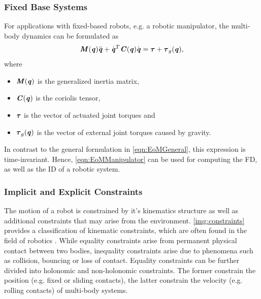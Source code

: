 \subsubsection{Fixed Base Systems}
For applications with fixed-based robots, e.g. a robotic manipulator, the multi-body dynamics can be formulated as
\begin{equation} \label{eqn:EoMManipulator}
\bm{\mathit{M}}(\bm{\mathit{q}})\ddot{\bm{\mathit{q}}}+\dot{\bm{\mathit{q}}}^T\bm{\mathit{C}}(\bm{\mathit{q}})\dot{\bm{\mathit{q}}}=\bm{\mathit{\tau}}+\bm{\mathit{\tau}}_g(\bm{\mathit{q}}),
\end{equation}
where 
\begin{itemize}
\item $\bm{\mathit{M}}(\bm{\mathit{q}})$ is the generalized inertia matrix, 
\item $\bm{\mathit{C}}(\bm{\mathit{q}})$ is the coriolis tensor, 
\item $\bm{\mathit{\tau}}$ is the vector of actuated joint torques and 
\item $\bm{\mathit{\tau}}_g(\bm{\mathit{q}})$ is the vector of external joint torques caused by gravity.
\end{itemize}
In contrast to the general formulation in \cref{eqn:EoMGeneral}, this expression is time-invariant. Hence, \cref{eqn:EoMManipulator} can be used for computing the \gls{FD}, as well as the \gls{ID} of a robotic system.

\subsubsection{Implicit and Explicit Constraints}
The motion of a robot is constrained by it's kinematics structure as well as additional constraints that may arise from the environment. \cref{img:constraints} provides a classification of kinematic constraints, which are often found in the field of robotics \cite[Ch.3]{kumar2019modular}. While equality constraints arise from permanent physical contact between two bodies, inequality constraints arise due to phenomena such as collision, bouncing or loss of contact. Equality constraints can be further divided into holonomic and non-holonomic constraints. The former constrain the position (e.g. fixed or sliding contacts), the latter constrain the velocity (e.g. rolling contacts) of multi-body systems. 

